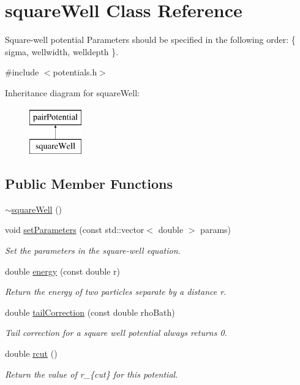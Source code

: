 \hypertarget{classsquare_well}{}\section{square\+Well Class Reference}
\label{classsquare_well}


Square-\/well potential Parameters should be specified in the following order\+: \{ sigma, wellwidth, welldepth \}.  




{\ttfamily \#include $<$potentials.\+h$>$}

Inheritance diagram for square\+Well\+:\begin{figure}[H]
\begin{center}
\leavevmode
\includegraphics[height=2.000000cm]{classsquare_well}
\end{center}
\end{figure}
\subsection*{Public Member Functions}
\begin{DoxyCompactItemize}
\item 
\hyperlink{classsquare_well_aee8080c488f394e2157648849e0e4b43}{$\sim$square\+Well} ()
\item 
void \hyperlink{classsquare_well_aa8770429044914778c2f343e025e09cc}{set\+Parameters} (const std\+::vector$<$ double $>$ params)
\begin{DoxyCompactList}\small\item\em Set the parameters in the square-\/well equation. \end{DoxyCompactList}\item 
double \hyperlink{classsquare_well_a318e7456943ad7c7f36cce0c9e2b2688}{energy} (const double r)
\begin{DoxyCompactList}\small\item\em Return the energy of two particles separate by a distance r. \end{DoxyCompactList}\item 
double \hyperlink{classsquare_well_a3a81297ea3a06f8a354c824a7ac5dc94}{tail\+Correction} (const double rho\+Bath)
\begin{DoxyCompactList}\small\item\em Tail correction for a square well potential always returns 0. \end{DoxyCompactList}\item 
double \hyperlink{classsquare_well_a82e1cc1009bd8e42e79e3c5f856f1b3b}{rcut} ()
\begin{DoxyCompactList}\small\item\em Return the value of r\+\_\+\{cut\} for this potential. \end{DoxyCompactList}\end{DoxyCompactItemize}
